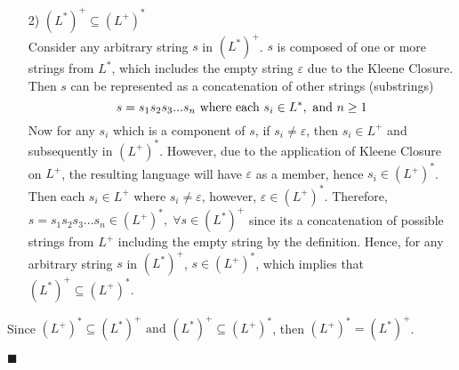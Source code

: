 \documentclass[a4paper]{exam}
\theoremstyle{definition}
\begin{document}
\begin{questions}
\begin{solution}
\begin{enumerate}[leftmargin=*]
  \item[2)] $ (L^*)^+ \subseteq (L^+)^* $ \\ 
  Consider any arbitrary string $s$ in $ (L^*)^+ $. $s$ is composed of one or more strings from $L^*$, which includes the empty string $\varepsilon$ due to the Kleene Closure. Then $s$ can be represented as a concatenation of other strings (substrings) \vspace*{-2mm}$$ s = s_1 s_2 s_3 ... s_n \text{ where each } s_i \in L^*, \text{ and } n \geq 1 \vspace*{-2mm}$$
  Now for any $s_i$ which is a component of $s$, if $s_i \neq \varepsilon$, then $s_i \in L^+$ and subsequently in $ (L^+)^* $. However, due to the application of Kleene Closure on $L^+$, the resulting language will have $\varepsilon$ as a member, hence $ s_i \in (L^+)^*$. Then each $s_i \in L^+ \text{ where } s_i \neq \varepsilon$, however, $ \varepsilon \in (L^+)^* $. Therefore, $ s = s_1 s_2 s_3 ... s_n \in (L^+)^*, \;\forall s \in (L^*)^+$ since its a concatenation of possible strings from $L^+$ including the empty string by the definition. Hence, for any arbitrary string $s$ in $ (L^*)^+ $, $s \in (L^+)^*$, which implies that $ (L^*)^+ \subseteq (L^+)^* $.
  

\end{enumerate}
Since $ (L^+)^* \subseteq (L^*)^+ \text{ and } (L^*)^+ \subseteq (L^+)^* $, then $ (L^+)^* = (L^*)^+ $.
\begin{flushright}
  $\blacksquare$
\end{flushright}

\end{solution}
  
\end{questions}
\end{document}
